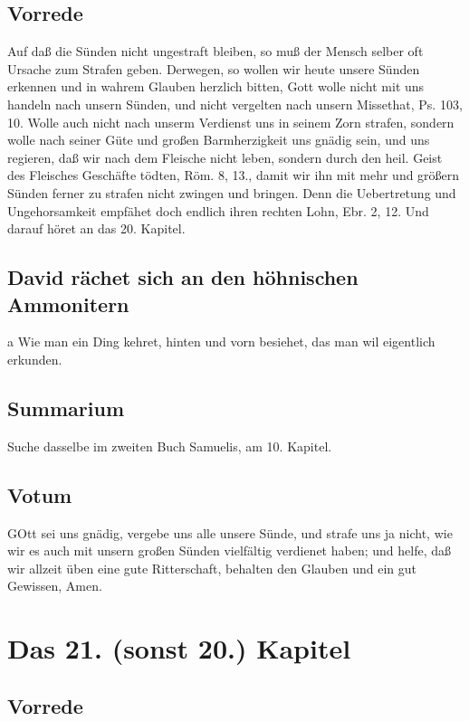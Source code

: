 \section{Vorrede}

Auf daß die Sünden nicht ungestraft bleiben, so muß der Mensch selber oft Ursache zum Strafen geben. Derwegen, so wollen wir heute unsere Sünden erkennen und in wahrem Glauben herzlich bitten, Gott wolle nicht mit uns handeln nach unsern Sünden, und nicht vergelten nach unsern Missethat, Ps. 103, 10. Wolle auch nicht nach unserm Verdienst uns in seinem Zorn strafen, sondern wolle nach seiner Güte und großen Barmherzigkeit uns gnädig sein, und uns regieren, daß wir nach dem Fleische nicht leben, sondern durch den heil. Geist des Fleisches Geschäfte tödten, Röm. 8, 13., damit wir ihn mit mehr und größern Sünden ferner zu strafen nicht zwingen und bringen. Denn die Uebertretung und Ungehorsamkeit empfähet doch endlich ihren rechten Lohn, Ebr. 2, 12. Und darauf höret an das 20. Kapitel.

\section[David rächet sich an den höhnischen Ammonitern]{David rächet sich an den höhnischen Ammonitern}

a Wie man ein Ding kehret, hinten und vorn besiehet, das man wil eigentlich erkunden.

\section{Summarium}

Suche dasselbe im zweiten Buch Samuelis, am 10. Kapitel.

\section{Votum}

GOtt sei uns gnädig, vergebe uns alle unsere Sünde, und strafe uns ja nicht, wie wir es auch mit unsern großen Sünden vielfältig verdienet haben; und helfe, daß wir allzeit üben eine gute Ritterschaft, behalten den Glauben und ein gut Gewissen, Amen.

\chapter{Das 21. (sonst 20.) Kapitel}

\section{Vorrede}

